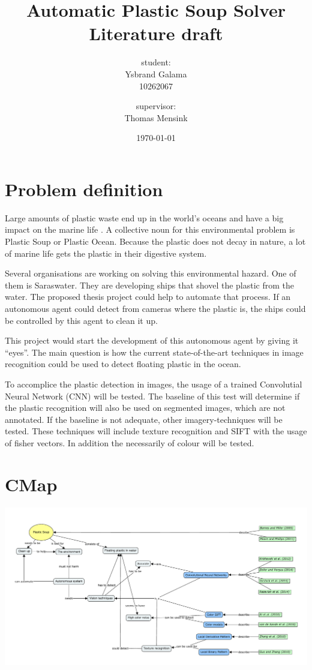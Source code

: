 \documentclass[a4paper, 11pt]{article}
\title{Automatic Plastic Soup Solver\\ {\Large Literature draft}}
\author{student: \\Ysbrand Galama \\ 10262067 \and supervisor: \\ Thomas Mensink}
\date{\today}
\begin{document}
\maketitle

\section*{Problem definition} Large amounts of plastic waste end up in the world's oceans and have a big impact on the marine life \citep{barnes2005drifting}.
A collective noun for this environmental problem is Plastic Soup or Plastic Ocean.
Because the plastic does not decay in nature, a lot of marine life gets the plastic in their digestive system.

Several organisations are working on solving this environmental hazard.
One of them is Saraswater.
They are developing ships that shovel the plastic from the water.
The proposed thesis project could help to automate that process.
If an autonomous agent could detect from cameras where the plastic is, the ships could be controlled by this agent to clean it up.

This project would start the development of this autonomous agent by giving it ``eyes''. The main question is how the current state-of-the-art techniques in image recognition could be used to detect floating plastic in the ocean.

To accomplice the plastic detection in images, the usage of a trained Convolutial Neural Network (CNN) will be tested. The baseline of this test will determine if the plastic recognition will also be used on segmented images, which are not annotated. If the baseline is not adequate, other imagery-techniques will be tested. These techniques will include texture recognition and SIFT with the usage of fisher vectors. In addition the necessarily of colour will be tested.

\section*{CMap}
\includegraphics[width=\textwidth]{images/scriptie_1.pdf}
\end{document}
